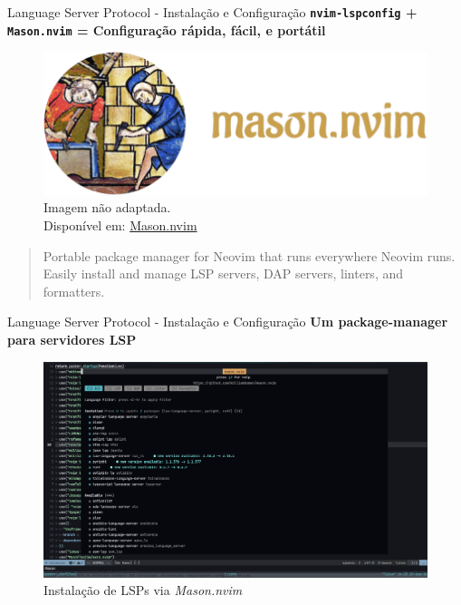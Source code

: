 \begin{frame}{Language Server Protocol - Instalação e Configuração}
  \textbf{\texttt{nvim-lspconfig} + \texttt{Mason.nvim} = Configuração rápida, fácil, e portátil}
  \begin{figure}
      \centering
      \includegraphics[height=0.3\linewidth]{Image/Mason-Logo.png}
      \label{mason-logo}
      \footnotesize
      \\ Imagem não adaptada. \\
      Disponível em:  \hyperlink{https://github.com/williamboman/mason.nvim}{Mason.nvim}
  \end{figure}
  \begin{quotation} \small
    Portable package manager for Neovim that runs everywhere Neovim runs. Easily install and manage LSP servers, DAP
    servers, linters, and formatters.\cite{masonNvim}
  \end{quotation}
\end{frame}

\begin{frame}{Language Server Protocol - Instalação e Configuração}
  \textbf{Um package-manager para servidores LSP}
  \begin{figure}
      \centering
      \includegraphics[height=0.5\linewidth]{Image/MasonLSP.png}
      \label{neovim-logo-2}
      \footnotesize
      \\ Instalação de LSPs via \textit{Mason.nvim} \\
  \end{figure}
\end{frame}

